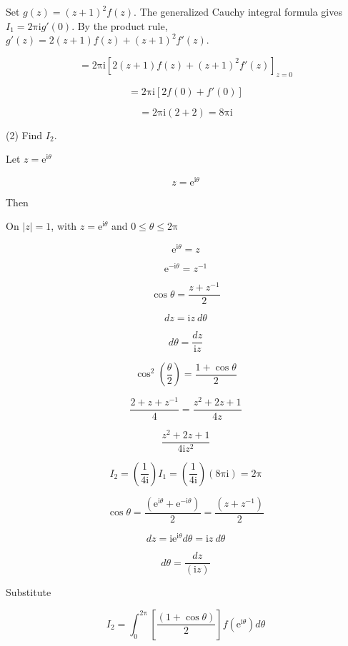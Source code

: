\documentclass[11pt,a4paper]{article}
\theoremstyle{definition}
\theoremstyle{plain}
\begin{document}
Set $g(z) = (z + 1)^{2}f(z)$. The generalized Cauchy integral formula gives $I_{1} = 2\mathrm{\pi}\mathrm{i}g'(0)$. By the product rule, $g'(z) = 2(z + 1)f(z) + (z + 1)^{2}f'(z)$.

\[
= 2\mathrm{\pi}\mathrm{i}{[2(z + 1)f(z) + (z + 1)^{2}f'(z)]}_{z = 0}
\]

\[
= 2\mathrm{\pi}\mathrm{i}[2f(0) + f'(0)]
\]

\[
= 2\mathrm{\pi}\mathrm{i}(2 + 2) = 8\mathrm{\pi}\mathrm{i}
\]

(2) Find $I_{2}$.

Let $z = \mathrm{e}^{\mathrm{i}\theta}$

\begin{equation}
z = \mathrm{e}^{\mathrm{i}\theta}
\end{equation}

Then

On $\vert{}z\vert{} = 1$, with $z = \mathrm{e}^{\mathrm{i}\theta}$ and $0 \le \theta \le 2\mathrm{\pi}$

\begin{equation}
\mathrm{e}^{\mathrm{i}\theta} = z
\end{equation}

\[
\mathrm{e}^{-\mathrm{i}\theta} = z^{-1}
\]

\[
\cos \theta = \frac{z + z^{-1}}{2}
\]

\[
dz = \mathrm{i}z\ d\theta
\]

\[
d\theta = \frac{dz}{\mathrm{i}z}
\]

\[
\cos^{2}\left(\frac{\theta}{2}\right) = \frac{1 + \cos \theta}{2}
\]

\[
\frac{2 + z + z^{-1}}{4} = \frac{z^{2} + 2z + 1}{4z}
\]

\[
\frac{z^{2} + 2z + 1}{4\mathrm{i}z^{2}}
\]

\[
I_{2} = \left(\frac{1}{4\mathrm{i}}\right)I_{1} = \left(\frac{1}{4\mathrm{i}}\right)(8\mathrm{\pi}\mathrm{i}) = 2\mathrm{\pi}
\]

\[
\cos \theta = \frac{(\mathrm{e}^{\mathrm{i}\theta} + \mathrm{e}^{-\mathrm{i}\theta})}{2} = \frac{(z + z^{-1})}{2}
\]

\[
dz = {\mathrm{i}\mathrm{e}}^{\mathrm{i}\theta}d\theta = \mathrm{i}z\ d\theta
\]

\[
d\theta = \frac{dz}{(\mathrm{i}z)}
\]

Substitute

\begin{equation}
I_{2} = \int_{0}^{2\mathrm{\pi}}[\frac{(1 + \cos \theta)}{2}]f(\mathrm{e}^{\mathrm{i}\theta})d\theta
\end{equation}
\end{document}
